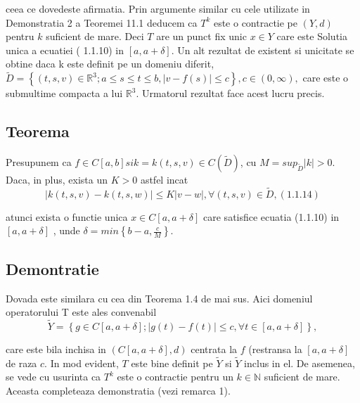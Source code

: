\documentclass[a4paper,12pt,oneside]{report}
\begin{document}
ceea ce dovedeste afirmatia. Prin argumente similar cu cele utilizate in Demonstratia 2 a Teoremei 11.1 deducem ca \(T^{k}\) este o contractie pe \(\left ( Y,d \right )\) pentru \(k\) suficient de mare. Deci \(T\) are un punct fix unic \(x \in Y\) care este Solutia unica a ecuatiei ( 1.1.10) in \(\left [ a, a + \delta  \right ]\). 
	Un alt rezultat de existent si unicitate se obtine daca k este definit pe un domeniu diferit, \(\tilde{D} = \left \{ \left ( t,s,v \right ) \in \mathbb{R}^{3}; a\leq s\leq t\leq b, \left | v - f\left ( s \right ) \right | \leq c \right \}, c\in \left ( 0, \infty  \right ), \)
care este o submultime compacta a lui \(\mathbb{R}^{3}\). Urmatorul rezultat face acest lucru precis. 

\subsection{Teorema}

Presupunem ca \(f \in C \left [ a,b \right ] si k = k\left ( t,s,v \right ) \in C\left ( \tilde{D} \right )\), cu \(M = sup _{\tilde{D}}\left | k \right |> 0\). Daca, in plus, exista un \(K > 0\) astfel incat 
\begin{displaymath}
  \left | k\left ( t,s,v \right ) - k \left ( t,s,w \right ) \right | \leq K \left | v-w \right |, \forall \left ( t,s,v \right ) \in \tilde{D}, (1.1.14)
\end{displaymath}

atunci exista o functie unica \(x \in C \left [ a, a + \delta  \right ]\) care satisfice ecuatia (1.1.10)  in  \(\left [ a, a + \delta  \right ]\) , unde \(\delta = min \left \{ b-a, \frac{c}{M} \right \}\). 

\subsection{Demontratie}

Dovada este similara cu cea din Teorema 1.4 de mai sus. Aici domeniul operatorului T este ales convenabil 
\begin{displaymath}
  \tilde{Y} = \left \{ g \in C \left [ a, a+ \delta  \right ] ; \left | g\left ( t \right ) - f\left ( t \right ) \right | \leq c, \forall t \in \left [ a, a+ \delta  \right ] \right \}, 
\end{displaymath}

care este bila inchisa in \(\left ( C\left [ a, a+ \delta  \right ], d \right )\) centrata la \(f\) (restransa la \(\left [ a, a+ \delta  \right ]\) de raza \(c\). In mod evident, \(T\) este bine definit pe \(\tilde{Y}\) si \(\tilde{Y}\) inclus in el. De asemenea, se vede cu usurinta ca \(T^{k}\) este o contractie pentru un \(k \in \mathbb{N}\)  suficient de mare. Aceasta completeaza demonstratia (vezi remarca 1).   
\end{document}

